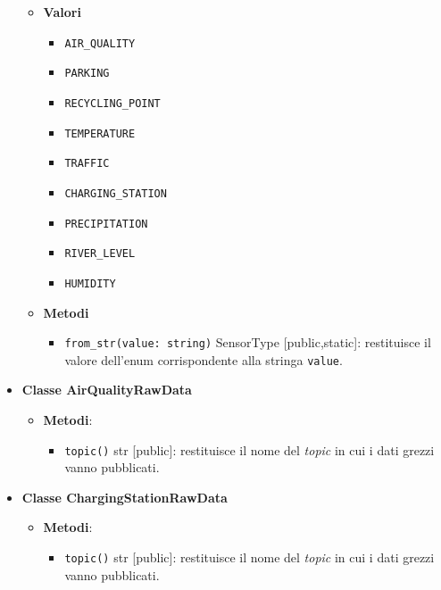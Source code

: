 \begin{itemize}
	      \begin{itemize}
		      \item \textbf{Valori}
		            \begin{itemize}
			            \item \texttt{AIR\_QUALITY}
			            \item \texttt{PARKING}
			            \item \texttt{RECYCLING\_POINT}
			            \item \texttt{TEMPERATURE}
			            \item \texttt{TRAFFIC}
			            \item \texttt{CHARGING\_STATION}
			            \item \texttt{PRECIPITATION}
			            \item \texttt{RIVER\_LEVEL}
			            \item \texttt{HUMIDITY}
		            \end{itemize}
		      \item \textbf{Metodi}
		            \begin{itemize}
			            \item \texttt{from\_str(value: string)} SensorType [public,static]: restituisce il valore dell'enum corrispondente alla stringa \texttt{value}.
		            \end{itemize}
	      \end{itemize}
	\item \textbf{Classe AirQualityRawData}
	      \begin{itemize}
		      \item \textbf{Metodi}:
		            \begin{itemize}
			            \item \texttt{topic()} str [public]: restituisce il nome del \textit{topic} in cui i dati grezzi vanno pubblicati.
		            \end{itemize}
	      \end{itemize}
	\item \textbf{Classe ChargingStationRawData}
	      \begin{itemize}
		      \item \textbf{Metodi}:
		            \begin{itemize}
			            \item \texttt{topic()} str [public]: restituisce il nome del \textit{topic} in cui i dati grezzi vanno pubblicati.
		            \end{itemize}
	      \end{itemize}

\end{itemize}
